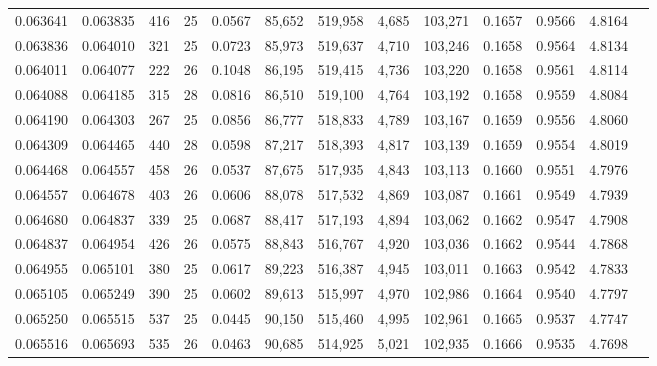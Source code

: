 \begin{tabular}{rrrrrrrrrrrrr}
0.063641 & 0.063835 & 416 &  25 &                                     0.0567 &  85,652 & 519,958 &   4,685 & 103,271 & 0.1657 & 0.9566 & 4.8164 \\
0.063836 & 0.064010 & 321 &  25 &                                     0.0723 &  85,973 & 519,637 &   4,710 & 103,246 & 0.1658 & 0.9564 & 4.8134 \\
0.064011 & 0.064077 & 222 &  26 &                                     0.1048 &  86,195 & 519,415 &   4,736 & 103,220 & 0.1658 & 0.9561 & 4.8114 \\
0.064088 & 0.064185 & 315 &  28 &                                     0.0816 &  86,510 & 519,100 &   4,764 & 103,192 & 0.1658 & 0.9559 & 4.8084 \\
0.064190 & 0.064303 & 267 &  25 &                                     0.0856 &  86,777 & 518,833 &   4,789 & 103,167 & 0.1659 & 0.9556 & 4.8060 \\
0.064309 & 0.064465 & 440 &  28 &                                     0.0598 &  87,217 & 518,393 &   4,817 & 103,139 & 0.1659 & 0.9554 & 4.8019 \\
0.064468 & 0.064557 & 458 &  26 &                                     0.0537 &  87,675 & 517,935 &   4,843 & 103,113 & 0.1660 & 0.9551 & 4.7976 \\
0.064557 & 0.064678 & 403 &  26 &                                     0.0606 &  88,078 & 517,532 &   4,869 & 103,087 & 0.1661 & 0.9549 & 4.7939 \\
0.064680 & 0.064837 & 339 &  25 &                                     0.0687 &  88,417 & 517,193 &   4,894 & 103,062 & 0.1662 & 0.9547 & 4.7908 \\
0.064837 & 0.064954 & 426 &  26 &                                     0.0575 &  88,843 & 516,767 &   4,920 & 103,036 & 0.1662 & 0.9544 & 4.7868 \\
0.064955 & 0.065101 & 380 &  25 &                                     0.0617 &  89,223 & 516,387 &   4,945 & 103,011 & 0.1663 & 0.9542 & 4.7833 \\
0.065105 & 0.065249 & 390 &  25 &                                     0.0602 &  89,613 & 515,997 &   4,970 & 102,986 & 0.1664 & 0.9540 & 4.7797 \\
0.065250 & 0.065515 & 537 &  25 &                                     0.0445 &  90,150 & 515,460 &   4,995 & 102,961 & 0.1665 & 0.9537 & 4.7747 \\
0.065516 & 0.065693 & 535 &  26 &                                     0.0463 &  90,685 & 514,925 &   5,021 & 102,935 & 0.1666 & 0.9535 & 4.7698 \\

\end{tabular}
